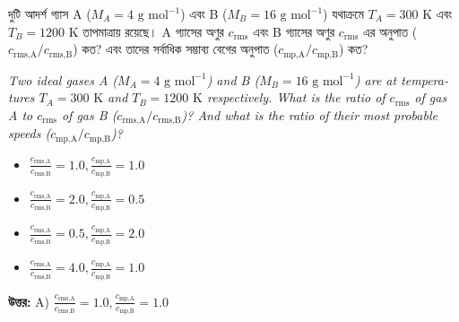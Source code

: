 \documentclass[12pt, a4paper]{article}
\begin{document}
\begin{tcolorbox}[questionbox={প্রশ্ন (Question) 6}]
    \noindent
    দুটি আদর্শ গ্যাস A ($M_A = 4\text{ g mol}^{-1}$) এবং B ($M_B = 16\text{ g mol}^{-1}$) যথাক্রমে $T_A = 300\text{ K}$ এবং $T_B = 1200\text{ K}$ তাপমাত্রায় রয়েছে। A গ্যাসের অণুর $c_{\text{rms}}$ এবং B গ্যাসের অণুর $c_{\text{rms}}$ এর অনুপাত ($c_{\text{rms,A}} / c_{\text{rms,B}}$) কত? এবং তাদের সর্বাধিক সম্ভাব্য বেগের অনুপাত ($c_{\text{mp,A}} / c_{\text{mp,B}}$) কত?
    
    \vspace{0.8em}
    \begin{english}
    \noindent\textit{\color{darkgray}
    Two ideal gases A ($M_A = 4\text{ g mol}^{-1}$) and B ($M_B = 16\text{ g mol}^{-1}$) are at temperatures $T_A = 300\text{ K}$ and $T_B = 1200\text{ K}$ respectively. What is the ratio of $c_{\text{rms}}$ of gas A to $c_{\text{rms}}$ of gas B ($c_{\text{rms,A}} / c_{\text{rms,B}}$)? And what is the ratio of their most probable speeds ($c_{\text{mp,A}} / c_{\text{mp,B}}$)?
    }
    \end{english}
\end{tcolorbox}

\begin{itemize}[label={}, leftmargin=1cm, itemsep=0.5em]
    \item[\textbf{A)}] $\frac{c_{\text{rms,A}}}{c_{\text{rms,B}}} = 1.0, \frac{c_{\text{mp,A}}}{c_{\text{mp,B}}} = 1.0$
    \item[\textbf{B)}] $\frac{c_{\text{rms,A}}}{c_{\text{rms,B}}} = 2.0, \frac{c_{\text{mp,A}}}{c_{\text{mp,B}}} = 0.5$
    \item[\textbf{C)}] $\frac{c_{\text{rms,A}}}{c_{\text{rms,B}}} = 0.5, \frac{c_{\text{mp,A}}}{c_{\text{mp,B}}} = 2.0$
    \item[\textbf{D)}] $\frac{c_{\text{rms,A}}}{c_{\text{rms,B}}} = 4.0, \frac{c_{\text{mp,A}}}{c_{\text{mp,B}}} = 1.0$
\end{itemize}

\vspace{0.5em}
\begin{tcolorbox}[answerbox]
    \textbf{\color{success} উত্তর:} A) $\frac{c_{\text{rms,A}}}{c_{\text{rms,B}}} = 1.0, \frac{c_{\text{mp,A}}}{c_{\text{mp,B}}} = 1.0$
\end{tcolorbox}
\vspace{1em}
\end{document}
